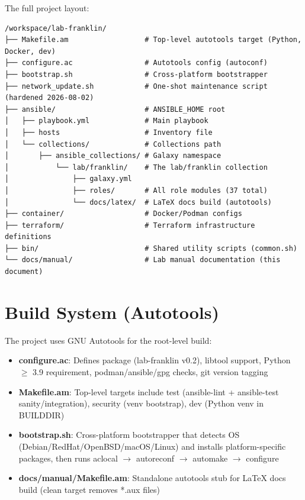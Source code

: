 The full project layout:
\begin{lstlisting}[style=mystyle]
/workspace/lab-franklin/
├── Makefile.am                  # Top-level autotools target (Python, Docker, dev)
├── configure.ac                 # Autotools config (autoconf)
├── bootstrap.sh                 # Cross-platform bootstrapper
├── network_update.sh            # One-shot maintenance script (hardened 2026-08-02)
├── ansible/                     # ANSIBLE_HOME root
│   ├── playbook.yml             # Main playbook
│   ├── hosts                    # Inventory file
│   └── collections/             # Collections path
│       ├── ansible_collections/ # Galaxy namespace
│           └── lab/franklin/    # The lab/franklin collection
│               ├── galaxy.yml
│               ├── roles/       # All role modules (37 total)
│               └── docs/latex/  # LaTeX docs build (autotools)
├── container/                   # Docker/Podman configs
├── terraform/                   # Terraform infrastructure definitions
├── bin/                         # Shared utility scripts (common.sh)
└── docs/manual/                 # Lab manual documentation (this document)
    \end{lstlisting}

\section{Build System (Autotools)}

The project uses GNU Autotools for the root-level build:

\begin{itemize}
    \item \textbf{configure.ac}: Defines package (lab-franklin v0.2), libtool support, Python $\ge$ 3.9 requirement, podman/ansible/gpg checks, git version tagging
    
    \item \textbf{Makefile.am}: Top-level targets include test (ansible-lint + ansible-test sanity/integration), security (venv bootstrap), dev (Python venv in BUILDDIR)
    
    \item \textbf{bootstrap.sh}: Cross-platform bootstrapper that detects OS (Debian/RedHat/OpenBSD/macOS/Linux) and installs platform-specific packages, then runs aclocal $\rightarrow$ autoreconf $\rightarrow$ automake $\rightarrow$ configure
    
    \item \textbf{docs/manual/Makefile.am}: Standalone autotools stub for LaTeX docs build (clean target removes *.aux files)
\end{itemize}

